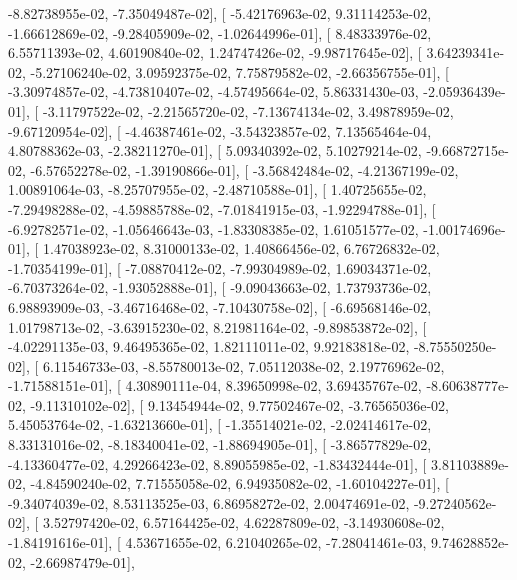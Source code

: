 \documentclass{article}
\begin{document}
         -8.82738955e-02,  -7.35049487e-02],
       [ -5.42176963e-02,   9.31114253e-02,  -1.66612869e-02,
         -9.28405909e-02,  -1.02644996e-01],
       [  8.48333976e-02,   6.55711393e-02,   4.60190840e-02,
          1.24747426e-02,  -9.98717645e-02],
       [  3.64239341e-02,  -5.27106240e-02,   3.09592375e-02,
          7.75879582e-02,  -2.66356755e-01],
       [ -3.30974857e-02,  -4.73810407e-02,  -4.57495664e-02,
          5.86331430e-03,  -2.05936439e-01],
       [ -3.11797522e-02,  -2.21565720e-02,  -7.13674134e-02,
          3.49878959e-02,  -9.67120954e-02],
       [ -4.46387461e-02,  -3.54323857e-02,   7.13565464e-04,
          4.80788362e-03,  -2.38211270e-01],
       [  5.09340392e-02,   5.10279214e-02,  -9.66872715e-02,
         -6.57652278e-02,  -1.39190866e-01],
       [ -3.56842484e-02,  -4.21367199e-02,   1.00891064e-03,
         -8.25707955e-02,  -2.48710588e-01],
       [  1.40725655e-02,  -7.29498288e-02,  -4.59885788e-02,
         -7.01841915e-03,  -1.92294788e-01],
       [ -6.92782571e-02,  -1.05646643e-03,  -1.83308385e-02,
          1.61051577e-02,  -1.00174696e-01],
       [  1.47038923e-02,   8.31000133e-02,   1.40866456e-02,
          6.76726832e-02,  -1.70354199e-01],
       [ -7.08870412e-02,  -7.99304989e-02,   1.69034371e-02,
         -6.70373264e-02,  -1.93052888e-01],
       [ -9.09043663e-02,   1.73793736e-02,   6.98893909e-03,
         -3.46716468e-02,  -7.10430758e-02],
       [ -6.69568146e-02,   1.01798713e-02,  -3.63915230e-02,
          8.21981164e-02,  -9.89853872e-02],
       [ -4.02291135e-03,   9.46495365e-02,   1.82111011e-02,
          9.92183818e-02,  -8.75550250e-02],
       [  6.11546733e-03,  -8.55780013e-02,   7.05112038e-02,
          2.19776962e-02,  -1.71588151e-01],
       [  4.30890111e-04,   8.39650998e-02,   3.69435767e-02,
         -8.60638777e-02,  -9.11310102e-02],
       [  9.13454944e-02,   9.77502467e-02,  -3.76565036e-02,
          5.45053764e-02,  -1.63213660e-01],
       [ -1.35514021e-02,  -2.02414617e-02,   8.33131016e-02,
         -8.18340041e-02,  -1.88694905e-01],
       [ -3.86577829e-02,  -4.13360477e-02,   4.29266423e-02,
          8.89055985e-02,  -1.83432444e-01],
       [  3.81103889e-02,  -4.84590240e-02,   7.71555058e-02,
          6.94935082e-02,  -1.60104227e-01],
       [ -9.34074039e-02,   8.53113525e-03,   6.86958272e-02,
          2.00474691e-02,  -9.27240562e-02],
       [  3.52797420e-02,   6.57164425e-02,   4.62287809e-02,
         -3.14930608e-02,  -1.84191616e-01],
       [  4.53671655e-02,   6.21040265e-02,  -7.28041461e-03,
          9.74628852e-02,  -2.66987479e-01],
\end{document}
